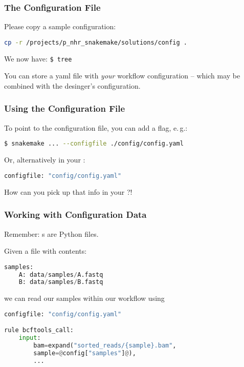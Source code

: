 \begin{frame}[fragile]
  \frametitle{The Configuration File}
  Please copy a sample configuration:
  \begin{lstlisting}[language=Bash, style=Shell]
cp -r /projects/p_nhr_snakemake/solutions/config .
  \end{lstlisting}
  We now have:\newline
            {\tiny \DTsetlength{0.2em}{1em}{0.2em}{0.4pt}{.6pt}
\texttt{\$ tree}
}
 \pause
 \begin{docs}
 	You can store a yaml file with \emph{your} workflow configuration -- which may be combined with the desinger's configuration.
 \end{docs}
\end{frame}

\begin{frame}[fragile]
  \frametitle{Using the Configuration File}
  To point to the configuration file, you can add a flag, e.\,g.:
  \begin{lstlisting}[language=Bash, style=Shell]
$ snakemake ... --configfile ./config/config.yaml  
  \end{lstlisting}
  Or, alternatively in your :
  \begin{lstlisting}[language=Python,style=Python]
configfile: "config/config.yaml"
  \end{lstlisting}  
  \begin{question}
  	How can you pick up that info in your ?!
  \end{question}
\end{frame} 

\begin{frame}[fragile]
  \frametitle{Working with Configuration Data}
  \begin{hint}
  	Remember: s are Python files.
  \end{hint}
  \pause
  Given a file  with contents:
  \begin{lstlisting}[language=Python,style=Python]
samples:
    A: data/samples/A.fastq
    B: data/samples/B.fastq
  \end{lstlisting}
  we can read our samples within our workflow using
  \begin{lstlisting}[language=Python,style=Python]
configfile: "config/config.yaml"

rule bcftools_call:
    input:
        bam=expand("sorted_reads/{sample}.bam", 
        sample=@config["samples"]@),
        ...
  \end{lstlisting}
\end{frame}

